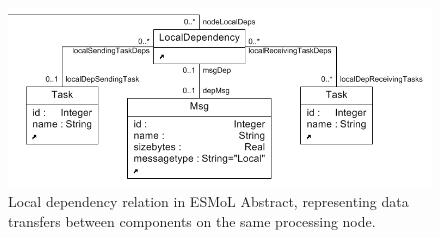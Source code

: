 \begin{figure}
\centering
\includegraphics[width=0.8\columnwidth]{figures/localdeps.png}
    \caption{Local dependency relation in ESMoL Abstract, representing data
transfers between components on the same processing node.}
    \label{fig:localdep_meta}
\end{figure}

\begin{table}
\centering


\end{table}
